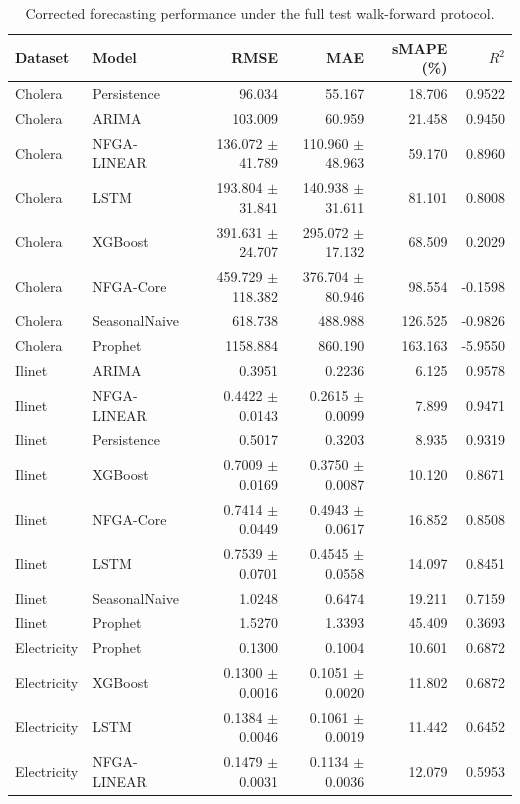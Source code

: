 \begin{table}[t]
\centering
\caption{Corrected forecasting performance under the full test walk-forward protocol.}
\label{tab:final_forecast}
\begin{tabular}{llrrrr}
\toprule
Dataset & Model & RMSE & MAE & sMAPE (\%) & $R^2$ \\
\midrule
Cholera & Persistence & 96.034 & 55.167 & 18.706 & 0.9522 \\
Cholera & ARIMA & 103.009 & 60.959 & 21.458 & 0.9450 \\
Cholera & NFGA-LINEAR & 136.072 $\pm$ 41.789 & 110.960 $\pm$ 48.963 & 59.170 & 0.8960 \\
Cholera & LSTM & 193.804 $\pm$ 31.841 & 140.938 $\pm$ 31.611 & 81.101 & 0.8008 \\
Cholera & XGBoost & 391.631 $\pm$ 24.707 & 295.072 $\pm$ 17.132 & 68.509 & 0.2029 \\
Cholera & NFGA-Core & 459.729 $\pm$ 118.382 & 376.704 $\pm$ 80.946 & 98.554 & -0.1598 \\
Cholera & SeasonalNaive & 618.738 & 488.988 & 126.525 & -0.9826 \\
Cholera & Prophet & 1158.884 & 860.190 & 163.163 & -5.9550 \\
\midrule
Ilinet & ARIMA & 0.3951 & 0.2236 & 6.125 & 0.9578 \\
Ilinet & NFGA-LINEAR & 0.4422 $\pm$ 0.0143 & 0.2615 $\pm$ 0.0099 & 7.899 & 0.9471 \\
Ilinet & Persistence & 0.5017 & 0.3203 & 8.935 & 0.9319 \\
Ilinet & XGBoost & 0.7009 $\pm$ 0.0169 & 0.3750 $\pm$ 0.0087 & 10.120 & 0.8671 \\
Ilinet & NFGA-Core & 0.7414 $\pm$ 0.0449 & 0.4943 $\pm$ 0.0617 & 16.852 & 0.8508 \\
Ilinet & LSTM & 0.7539 $\pm$ 0.0701 & 0.4545 $\pm$ 0.0558 & 14.097 & 0.8451 \\
Ilinet & SeasonalNaive & 1.0248 & 0.6474 & 19.211 & 0.7159 \\
Ilinet & Prophet & 1.5270 & 1.3393 & 45.409 & 0.3693 \\
\midrule
Electricity & Prophet & 0.1300 & 0.1004 & 10.601 & 0.6872 \\
Electricity & XGBoost & 0.1300 $\pm$ 0.0016 & 0.1051 $\pm$ 0.0020 & 11.802 & 0.6872 \\
Electricity & LSTM & 0.1384 $\pm$ 0.0046 & 0.1061 $\pm$ 0.0019 & 11.442 & 0.6452 \\
Electricity & NFGA-LINEAR & 0.1479 $\pm$ 0.0031 & 0.1134 $\pm$ 0.0036 & 12.079 & 0.5953 \\

\end{tabular}
\end{table}
